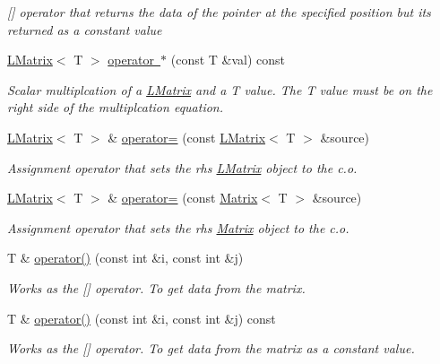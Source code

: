 \begin{DoxyCompactItemize}
\begin{DoxyCompactList}\small\item\em \mbox{[}\mbox{]} operator that returns the data of the pointer at the specified position but its returned as a constant value \end{DoxyCompactList}\item 
\mbox{\hyperlink{class_l_matrix}{L\+Matrix}}$<$ T $>$ \mbox{\hyperlink{class_l_matrix_ac8df9082c434b41a98d26defb95ea388}{operator $\ast$}} (const T \&val) const
\begin{DoxyCompactList}\small\item\em Scalar multiplcation of a \mbox{\hyperlink{class_l_matrix}{L\+Matrix}} and a T value. The T value must be on the right side of the multiplcation equation. \end{DoxyCompactList}\item 
\mbox{\hyperlink{class_l_matrix}{L\+Matrix}}$<$ T $>$ \& \mbox{\hyperlink{class_l_matrix_ad4feb8e3706e9ce8fdb07e63d985f52f}{operator=}} (const \mbox{\hyperlink{class_l_matrix}{L\+Matrix}}$<$ T $>$ \&source)
\begin{DoxyCompactList}\small\item\em Assignment operator that sets the rhs \mbox{\hyperlink{class_l_matrix}{L\+Matrix}} object to the c.\+o. \end{DoxyCompactList}\item 
\mbox{\hyperlink{class_l_matrix}{L\+Matrix}}$<$ T $>$ \& \mbox{\hyperlink{class_l_matrix_a4417a98f81bcd9797241cf658b8ba400}{operator=}} (const \mbox{\hyperlink{class_matrix}{Matrix}}$<$ T $>$ \&source)
\begin{DoxyCompactList}\small\item\em Assignment operator that sets the rhs \mbox{\hyperlink{class_matrix}{Matrix}} object to the c.\+o. \end{DoxyCompactList}\item 
T \& \mbox{\hyperlink{class_l_matrix_aa0b1bc37d56538dbdd4fcb3b88dcc3ec}{operator()}} (const int \&i, const int \&j)
\begin{DoxyCompactList}\small\item\em Works as the \mbox{[}\mbox{]} operator. To get data from the matrix. \end{DoxyCompactList}\item 
T \& \mbox{\hyperlink{class_l_matrix_ae9d404d99117892edd2fbfddfaf929f5}{operator()}} (const int \&i, const int \&j) const
\begin{DoxyCompactList}\small\item\em Works as the \mbox{[}\mbox{]} operator. To get data from the matrix as a constant value. \end{DoxyCompactList}\item 

\end{DoxyCompactItemize}
